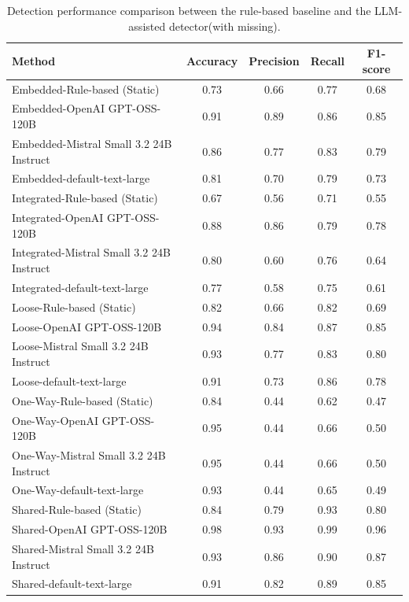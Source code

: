 \begin{table}[h]
\centering
\caption{Detection performance comparison between the rule-based baseline and the LLM-assisted detector(with missing).}
\label{tab:detection_performance}
\footnotesize
\begin{tabular}{lcccc}
\hline
\textbf{Method} & \textbf{Accuracy} & \textbf{Precision} & \textbf{Recall} & \textbf{F1-score} \\
\hline
Embedded-Rule-based (Static) & 0.73 & 0.66 & 0.77 & 0.68 \\
Embedded-OpenAI GPT-OSS-120B & 0.91 & 0.89 & 0.86 & 0.85 \\
Embedded-Mistral Small 3.2 24B Instruct & 0.86 & 0.77 & 0.83 & 0.79 \\
Embedded-default-text-large & 0.81 & 0.70 & 0.79 & 0.73 \\
\hline
Integrated-Rule-based (Static) & 0.67 & 0.56 & 0.71 & 0.55 \\
Integrated-OpenAI GPT-OSS-120B & 0.88 & 0.86 & 0.79 & 0.78 \\
Integrated-Mistral Small 3.2 24B Instruct & 0.80 & 0.60 & 0.76 & 0.64 \\
Integrated-default-text-large & 0.77 & 0.58 & 0.75 & 0.61 \\
\hline
Loose-Rule-based (Static) & 0.82 & 0.66 & 0.82 & 0.69 \\
Loose-OpenAI GPT-OSS-120B & 0.94 & 0.84 & 0.87 & 0.85 \\
Loose-Mistral Small 3.2 24B Instruct & 0.93 & 0.77 & 0.83 & 0.80 \\
Loose-default-text-large & 0.91 & 0.73 & 0.86 & 0.78 \\
\hline
One-Way-Rule-based (Static) & 0.84 & 0.44 & 0.62 & 0.47 \\
One-Way-OpenAI GPT-OSS-120B & 0.95 & 0.44 & 0.66 & 0.50 \\
One-Way-Mistral Small 3.2 24B Instruct & 0.95 & 0.44 & 0.66 & 0.50 \\
One-Way-default-text-large & 0.93 & 0.44 & 0.65 & 0.49 \\
\hline
Shared-Rule-based (Static) & 0.84 & 0.79 & 0.93 & 0.80 \\
Shared-OpenAI GPT-OSS-120B & 0.98 & 0.93 & 0.99 & 0.96 \\
Shared-Mistral Small 3.2 24B Instruct & 0.93 & 0.86 & 0.90 & 0.87 \\
Shared-default-text-large & 0.91 & 0.82 & 0.89 & 0.85 \\
\hline
\end{tabular}
\end{table}